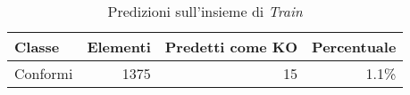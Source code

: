 \begin{table}[ht]
  \centering
  \begin{tabular}{||l r r r||}
    \hline
    Classe           & Elementi & Predetti come KO & Percentuale \\ \hline \hline
    Conformi         & 1375     & 15               & 1.1\%       \\ \hline

  \end{tabular}
  \caption{Predizioni sull'insieme di \textit{Train}}
  \label{tab:train_predicions}
\end{table}

